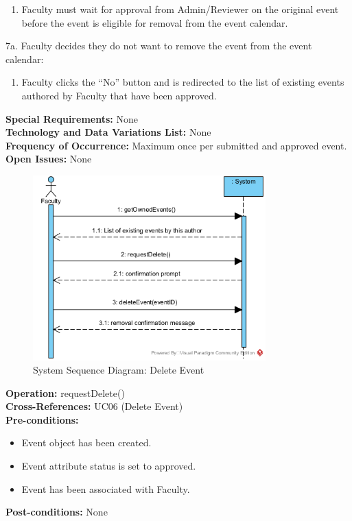\begin{enumerate}
    \item Faculty must wait for approval from Admin/Reviewer on the original event before the event is eligible for removal from the event calendar.
\end{enumerate}
7a. Faculty decides they do not want to remove the event from the event calendar:
\begin{enumerate}
    \item Faculty clicks the ``No'' button and is redirected to the list of existing events authored by Faculty that have been approved.
\end{enumerate}
\textbf{Special Requirements:} None \\
\textbf{Technology and Data Variations List:} None \\
\textbf{Frequency of Occurrence:} Maximum once per submitted and approved event. \\
\textbf{Open Issues:} None \\

\begin{figure}[H]
    \centering
    \includegraphics[width=0.8\textwidth]{images/SSD-UC06-DeleteEvent.png}
    \centering
    \caption{System Sequence Diagram: Delete Event}
\end{figure}

\textbf{Operation:} requestDelete() \\
\textbf{Cross-References:} UC06 (Delete Event) \\
\textbf{Pre-conditions:}
\begin{itemize}
    \item Event object has been created.
    \item Event attribute status is set to approved.
    \item Event has been associated with Faculty.
\end{itemize}
\textbf{Post-conditions:} None \\


